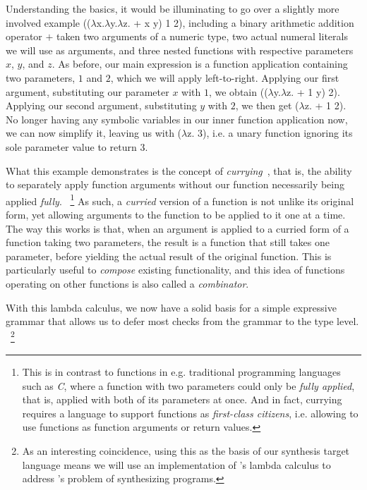 \documentclass{article}
\begin{document}
Understanding the basics,
it would be illuminating to go over a slightly more involved example (($\lambda$x.$\lambda$y.$\lambda$z. + x y) 1 2),
including a binary arithmetic addition operator $+$ taken two arguments of a numeric type,
two actual numeral literals we will use as arguments,
and three nested functions with respective parameters $x$, $y$, and $z$.
As before, our main expression is a function application containing two parameters, $1$ and $2$,
which we will apply left-to-right.
Applying our first argument, substituting our parameter $x$ with $1$,
we obtain (($\lambda$y.$\lambda$z. + 1 y) 2).
Applying our second argument, substituting $y$ with $2$,
we then get ($\lambda$z. + 1 2).
No longer having any symbolic variables in our inner function application now,
we can now simplify it, leaving us with ($\lambda$z. 3),
i.e. a unary function ignoring its sole parameter value to return $3$.

What this example demonstrates is the concept of \emph{currying}~\citep{currying},
that is, the ability to separately apply function arguments without our function necessarily being applied \emph{fully}.%
~\footnote{
    This is in contrast to functions in e.g. traditional programming languages such as \emph{C},
    where a function with two parameters could only be \emph{fully applied},
    that is, applied with both of its parameters at once.
    And in fact, currying requires a language to support functions as \emph{first-class citizens},
    i.e. allowing to use functions as function arguments or return values.
}
As such, a \emph{curried} version of a function is not unlike its original form,
yet allowing arguments to the function to be applied to it one at a time.
The way this works is that, when an argument is applied to a curried form of a function taking two parameters,
the result is a function that still takes one parameter, before yielding the actual result of the original function.
This is particularly useful to \emph{compose} existing functionality,
and this idea of functions operating on other functions is also called a \emph{combinator}.

With this lambda calculus, we now have a solid basis for a simple expressive grammar that allows us to defer most checks from the grammar to the type level.%
~\footnote{
    As an interesting coincidence,
    using this as the basis of our synthesis target language means
    we will use an implementation of \citet{lambdacalculus}'s lambda calculus
    to address \citet{church1957applications}'s problem of synthesizing programs.
}
\end{document}

